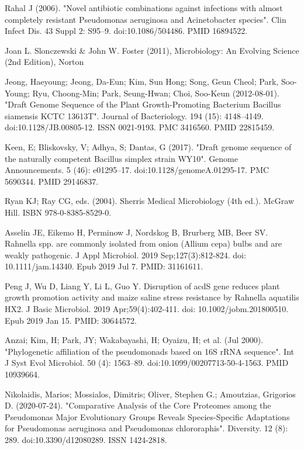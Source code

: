 \documentclass[11pt]{article}
\begin{document}
\begin{thebibliography}{3}
	 Rahal J (2006). "Novel antibiotic combinations against infections with almost completely resistant Pseudomonas aeruginosa and Acinetobacter species". Clin Infect Dis. 43 Suppl 2: S95–9. doi:10.1086/504486. PMID 16894522.
		
		
	  Joan L. Slonczewski \& John W. Foster (2011), Microbiology: An Evolving Science (2nd Edition), Norton

	 Jeong, Haeyoung; Jeong, Da-Eun; Kim, Sun Hong; Song, Geun Cheol; Park, Soo-Young; Ryu, Choong-Min; Park, Seung-Hwan; Choi, Soo-Keun (2012-08-01). "Draft Genome Sequence of the Plant Growth-Promoting Bacterium Bacillus siamensis KCTC 13613T". Journal of Bacteriology. 194 (15): 4148–4149. doi:10.1128/JB.00805-12. ISSN 0021-9193. PMC 3416560. PMID 22815459.

	 Keen, E; Bliskovsky, V; Adhya, S; Dantas, G (2017). "Draft genome sequence of the naturally competent Bacillus simplex strain WY10". Genome Announcements. 5 (46): e01295–17. doi:10.1128/genomeA.01295-17. PMC 5690344. PMID 29146837.

	 Ryan KJ; Ray CG, eds. (2004). Sherris Medical Microbiology (4th ed.). McGraw Hill. ISBN 978-0-8385-8529-0.
		
	 Asselin JE, Eikemo H, Perminow J, Nordskog B, Brurberg MB, Beer SV. Rahnella spp. are commonly isolated from onion (Allium cepa) bulbs and are weakly pathogenic. J Appl Microbiol. 2019 Sep;127(3):812-824. doi: 10.1111/jam.14340. Epub 2019 Jul 7. PMID: 31161611.
		
	 Peng J, Wu D, Liang Y, Li L, Guo Y. Disruption of acdS gene reduces plant growth promotion activity and maize saline stress resistance by Rahnella aquatilis HX2. J Basic Microbiol. 2019 Apr;59(4):402-411. doi: 10.1002/jobm.201800510. Epub 2019 Jan 15. PMID: 30644572.
	
	
	 Anzai; Kim, H; Park, JY; Wakabayashi, H; Oyaizu, H; et al. (Jul 2000). "Phylogenetic affiliation of the pseudomonads based on 16S rRNA sequence". Int J Syst Evol Microbiol. 50 (4): 1563–89. doi:10.1099/00207713-50-4-1563. PMID 10939664.
	 
	 Nikolaidis, Marios; Mossialos, Dimitris; Oliver, Stephen G.; Amoutzias, Grigorios D. (2020-07-24). "Comparative Analysis of the Core Proteomes among the Pseudomonas Major Evolutionary Groups Reveals Species-Specific Adaptations for Pseudomonas aeruginosa and Pseudomonas chlororaphis". Diversity. 12 (8): 289. doi:10.3390/d12080289. ISSN 1424-2818.
	

\end{thebibliography}
\end{document}
